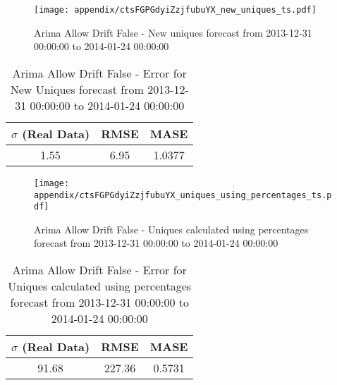 \begin{figure}[H] \begin{center} \leavevmode
\texttt{[image: appendix/ctsFGPGdyiZzjfubuYX\_new\_uniques\_ts.pdf]} \caption{
Arima Allow Drift False - New uniques forecast from 2013-12-31 00:00:00 to 2014-01-24 00:00:00} \label{fig:appendix/ctsFGPGdyiZzjfubuYX_new_uniques_ts.pdf} \end{center}
\end{figure}

\begin{table}[H]
\centering
\footnotesize
\begin{tabular}{ccc}
$\sigma$ (Real Data) & RMSE & MASE   \\ \hline
1.55 & 6.95 & 1.0377 \\
\end{tabular}

\vspace{0.5cm}

\caption{
Arima Allow Drift False - Error for New Uniques forecast from 2013-12-31 00:00:00 to 2014-01-24 00:00:00}
\end{table}

\begin{figure}[H] \begin{center} \leavevmode
\texttt{[image: appendix/ctsFGPGdyiZzjfubuYX\_uniques\_using\_percentages\_ts.pdf]} \caption{
Arima Allow Drift False - Uniques calculated using percentages forecast from 2013-12-31 00:00:00 to 2014-01-24 00:00:00} \label{fig:appendix/ctsFGPGdyiZzjfubuYX_uniques_using_percentages_ts.pdf} \end{center}
\end{figure}

\begin{table}[H]
\centering
\footnotesize
\begin{tabular}{ccc}
$\sigma$ (Real Data) & RMSE & MASE   \\ \hline
91.68 & 227.36 & 0.5731 \\
\end{tabular}

\vspace{0.5cm}

\caption{
Arima Allow Drift False - Error for Uniques calculated using percentages forecast from 2013-12-31 00:00:00 to 2014-01-24 00:00:00}
\end{table}

